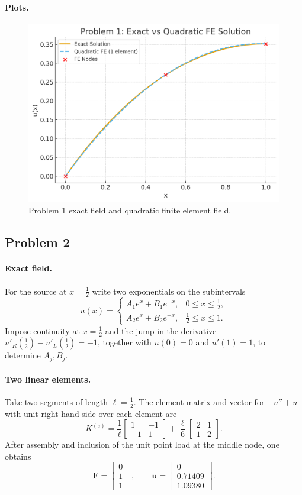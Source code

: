 \documentclass[12pt,a4paper]{article}
\begin{document}
\paragraph{Plots.}
\begin{figure}[H]
  \centering
  \includegraphics[width=0.7\linewidth]{hw3_prob1.png}
  \caption{Problem 1 exact field and quadratic finite element field.}
\end{figure}

\subsection*{Problem 2}
\paragraph{Exact field.}
For the source at $x=\tfrac12$ write two exponentials on the subintervals
\[
u(x)=
\begin{cases}
A_1 e^{x}+B_1 e^{-x}, & 0\le x\le \tfrac12,\\[2pt]
A_2 e^{x}+B_2 e^{-x}, & \tfrac12\le x\le 1.
\end{cases}
\]
Impose continuity at $x=\tfrac12$ and the jump in the derivative
\(
u'_R(\tfrac12)-u'_L(\tfrac12)=-1
\),
together with $u(0)=0$ and $u'(1)=1$, to determine $A_j,B_j$.

\paragraph{Two linear elements.}
Take two segments of length $\ell=\tfrac12$. The element matrix and vector for $-u''+u$ with unit right hand side over each element are
\[
K^{(e)}=\frac{1}{\ell}
\begin{bmatrix}
1&-1\\
-1&1
\end{bmatrix}
+\frac{\ell}{6}
\begin{bmatrix}
2&1\\
1&2
\end{bmatrix}.
\]
After assembly and inclusion of the unit point load at the middle node, one obtains
\[
\boldsymbol{F}=\begin{bmatrix}0\\1\\1\end{bmatrix},
\qquad
\boldsymbol{u}=
\begin{bmatrix}
0\\[2pt]
0.71409\\[2pt]
1.09380
\end{bmatrix}.
\]
\end{document}

